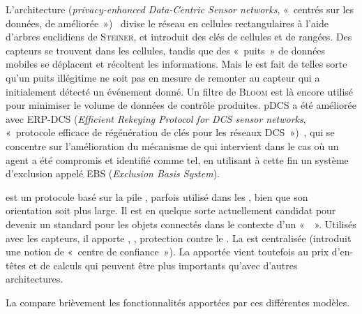 L'architecture  (\textit{privacy-enhanced Data-Centric Sensor networks}, « \rcs centrés sur les données, de  améliorée »)~\cite{SZZCY09} divise le réseau en cellules rectangulaires à l'aide d'arbres euclidiens de \textsc{Steiner}, et introduit des clés de cellules et de rangées.
Des capteurs se trouvent dans les cellules, tandis que des « puits » de données mobiles se déplacent et récoltent les informations.
Mais le  est fait de telles sorte qu'un puits illégitime ne soit pas en mesure de remonter au capteur qui a initialement détecté un événement donné.
Un filtre de \textsc{Bloom} est là encore utilisé pour minimiser le volume de données de contrôle produites.
pDCS a été améliorée avec ERP-DCS (\textit{Efficient Rekeying Protocol for DCS sensor networks}, « protocole efficace de régénération de clés pour les réseaux DCS »)~\cite{HYD13}, qui se concentre sur l'amélioration du mécanisme de  qui intervient dans le cas où un agent a été compromis et identifié comme tel, en utilisant à cette fin un système d'exclusion appelé EBS (\textit{Exclusion Basis System}).

\zigbee\cite{zigbee} est un protocole basé sur la pile \ieeeff, parfois utilisé dans les \rcs, bien que son orientation soit plus large.
Il est en quelque sorte actuellement candidat pour devenir un standard pour les objets connectés dans le contexte d'un «  ».
Utilisés avec les capteurs, il apporte , , protection contre le .
La  est centralisée (\zigbee introduit une notion de « centre de confiance »).
La \secu apportée vient toutefois au prix d'en-têtes et de calculs qui peuvent être plus importants qu'avec d'autres architectures.

La  compare brièvement les fonctionnalités apportées par ces différentes modèles.

